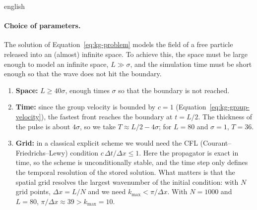 \documentclass[0000.tex]{subfiles}
\begin{document}
\begin{hyphenrules}{english}
\paragraph{Choice of parameters.}
The solution of Equation~\eqref{eq:kg-problem} models the field of a free particle released into an (almost)
infinite space. To achieve this, the space must be large enough to model an infinite space, $L\gg\sigma$,
and the simulation time must be short enough so that the wave does not hit the boundary.
\begin{enumerate}
  \item \textbf{Space:} $L\ge40\sigma$, enough times $\sigma$ so that the boundary is not reached.
  \item \textbf{Time:} since the group velocity is bounded by $c=1$ (Equation~\eqref{eq:kg-group-velocity}), the
    fastest front reaches the boundary at $t=L/2$. The thickness of the pulse is about $4\sigma$, so we
    take $T\approx L/2-4\sigma$; for $L=80$ and $\sigma=1$, $T=36$.
  \item \textbf{Grid:} in a classical explicit scheme we would need the CFL (Courant--Friedrichs--Lewy)
    condition $c\,\Delta t/\Delta x\le1$. Here the propagator is exact in time, so the scheme is
    unconditionally stable, and the time step only defines the temporal resolution of the stored
    solution. What matters is that the spatial grid resolves the largest wavenumber of the initial
    condition: with $N$ grid points, $\Delta x=L/N$ and we need $k_{\max}<\pi/\Delta x$. With $N=1000$ and
    $L=80$, $\pi/\Delta x\approx39>k_{\max}=10$.
\end{enumerate}


\end{hyphenrules}
\end{document}
